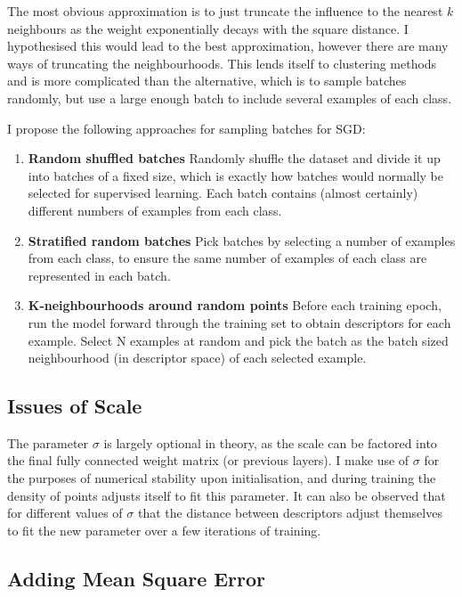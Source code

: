 The most obvious approximation is to just truncate the influence to the nearest $ k $ neighbours as the weight exponentially decays with the square distance. I hypothesised this would lead to the best approximation, however there are many ways of truncating the neighbourhoods. This lends itself to clustering methods and is more complicated than the alternative, which is to sample batches randomly, but use a large enough batch to include several examples of each class.

I propose the following approaches for sampling batches for \gls{SGD}:

\begin{enumerate}
\item {\bf Random shuffled batches}
 Randomly shuffle the dataset and divide it up into batches of a fixed size, which is exactly how batches would normally be selected for supervised learning. Each batch contains (almost certainly) different numbers of examples from each class.
 \item {\bf Stratified random batches} 
 Pick batches by selecting a number of examples from each class, to ensure the same number of examples of each class are represented in each batch.   
 \item {\bf K-neighbourhoods around random points}
 Before each training epoch, run the model forward through the training set to obtain descriptors for each example. Select N examples at random and pick the batch as the batch sized neighbourhood (in descriptor space) of each selected example.
\end {enumerate}


\subsection {Issues of Scale}

The parameter $ \sigma $ is largely optional in theory, as the scale can be factored into the final fully connected weight matrix (or previous layers).  I make use of $ \sigma $ for the purposes of numerical stability upon initialisation, and during training the density of points adjusts itself to fit this parameter. It can also be observed that for different values of $ \sigma $ that the distance between descriptors adjust themselves to fit the new parameter over a few iterations of training.


\subsection {Adding Mean Square Error}


